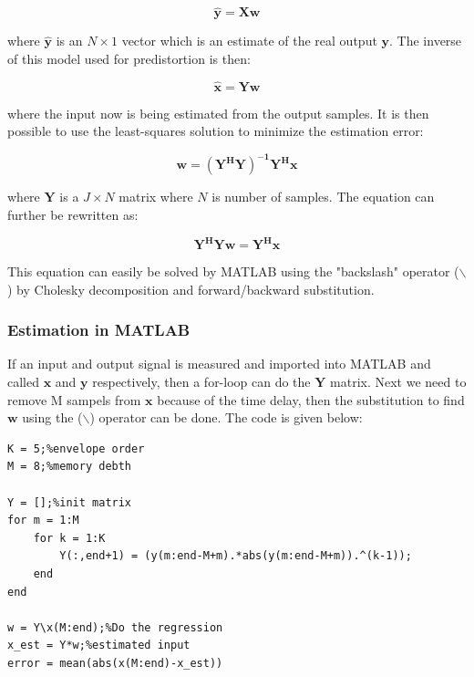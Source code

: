 \begin{equation}
\pmb{\hat{y} = Xw}
\end{equation}  

where $\pmb{\hat{y}}$ is an $N \times 1$ vector which is an estimate of the real output $\pmb{y}$. The inverse of this model used for predistortion is then:

\begin{equation}\label{eq:x_est}
\pmb{\hat{x} = Yw}
\end{equation} 

where the input now is being estimated from the output samples. It is then possible to use the least-squares solution to minimize the estimation error:

\begin{equation}
\pmb{w = (Y^H Y)^{-1} Y^H x}
\end{equation} 

where $\pmb{Y}$ is a $J \times N$ matrix where $N$ is number of samples. The equation can further be rewritten as:

\begin{equation}
\pmb{Y^H Y w = Y^H x}
\end{equation}

This equation can easily be solved by MATLAB using the "backslash" operator ($\backslash$) by Cholesky decomposition and forward/backward substitution.   

\subsubsection{Estimation in MATLAB}
If an input and output signal is measured and imported into MATLAB and called $\pmb{x}$ and $\pmb{y}$ respectively, then a for-loop can do the $\pmb{Y}$ matrix. Next we need to remove M sampels from $\pmb{x}$ because of the time delay, then the substitution to find $\pmb{w}$ using the ($\backslash$) operator can be done.  The code is given below: 

\begin{lstlisting}[frame = single]
K = 5;%envelope order
M = 8;%memory debth

Y = [];%init matrix
for m = 1:M
    for k = 1:K
        Y(:,end+1) = (y(m:end-M+m).*abs(y(m:end-M+m)).^(k-1));
    end
end

w = Y\x(M:end);%Do the regression
x_est = Y*w;%estimated input
error = mean(abs(x(M:end)-x_est))

\end{lstlisting}

